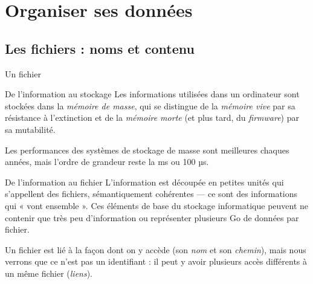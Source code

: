 \section{Organiser ses données}
\subsection{Les fichiers : noms et contenu}
\begin{frame}{Un fichier}
  \begin{block}{De l'information au stockage}
    Les informations utilisées dans un ordinateur sont stockées dans la
    \emph{mémoire de masse}, qui se distingue de la \emph{mémoire vive}
    par sa résistance à l'extinction et de la \emph{mémoire morte} (et
    plus tard, du \emph{firmware}) par sa mutabilité.

    Les performances des systèmes de stockage de masse sont meilleures
    chaques années, mais l'ordre de grandeur reste la ms ou 100 µs.
  \end{block}
  \begin{block}{De l'information au fichier}
    L'information est découpée en petites unités qui s'appellent des
    fichiers, sémantiquement cohérentes --- ce sont des informations qui
    « vont ensemble ». Ces éléments de base du stockage informatique
    peuvent ne contenir que très peu d'information ou représenter
    plusieurs Go de données par fichier.

    Un fichier est lié à la façon dont on y accède (son \emph{nom} et
    son \emph{chemin}), mais nous verrons que ce n'est pas un
    identifiant : il peut y avoir plusieurs accès différents à un même
    fichier (\emph{liens}).
  \end{block}
\end{frame}
